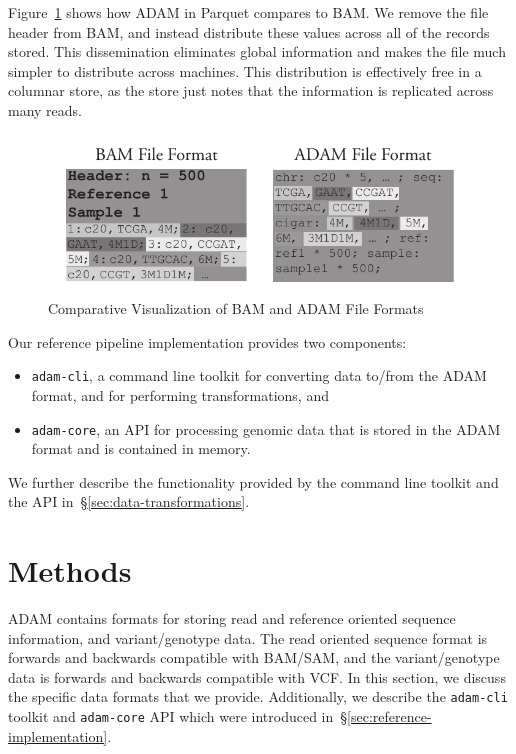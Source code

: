\documentclass{bioinfo}
\begin{document}
Figure~\ref{fig:file-format} shows how ADAM in Parquet compares to BAM. We remove the file header from BAM, and instead distribute these values across all of the records
stored. This dissemination eliminates global information and makes the file much simpler to distribute across machines. This distribution is effectively free in a columnar store,
as the store just notes that the information is replicated across many reads.

\begin{figure}[h]
\begin{center}
\includegraphics[width=\linewidth]{file-format.pdf}
\end{center}
\caption{Comparative Visualization of BAM and ADAM File Formats}
\label{fig:file-format}
\end{figure}

Our reference pipeline implementation provides two components:

\begin{itemize}
\item \texttt{adam-cli}, a command line toolkit for converting data to/from the ADAM format, and for performing transformations, and
\item \texttt{adam-core}, an API for processing genomic data that is stored in the ADAM format and is contained in memory.
\end{itemize}

We further describe the functionality provided by the command line toolkit and the API in~\S\ref{sec:data-transformations}.

\section{Methods}
\label{sec:methods}

ADAM contains formats for storing read and reference oriented sequence information, and variant/genotype data. The read oriented sequence format is forwards and
backwards compatible with BAM/SAM, and the variant/genotype data is forwards and backwards compatible with VCF. In this section, we discuss the specific data formats
that we provide. Additionally, we describe the \texttt{adam-cli} toolkit and \texttt{adam-core} API which were introduced in~\S\ref{sec:reference-implementation}.
\end{document}
